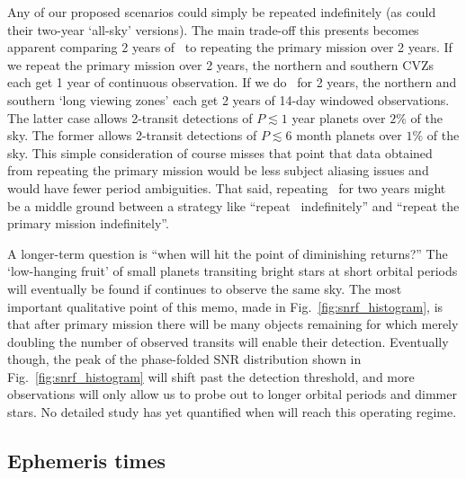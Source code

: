 Any of our proposed scenarios could simply be repeated indefinitely (as could their two-year `all-sky' versions).
The main trade-off this presents becomes apparent comparing 2 years of \hemis\ to repeating the primary mission over 2 years.
If we repeat the primary mission over 2 years, the northern and southern CVZs each get 1 year of continuous observation.
If we do \hemis\ for 2 years, the northern and southern `long viewing zones' each get 2 years of 14-day windowed observations.
The latter case allows 2-transit detections of $P\lesssim1$ year planets over $2\%$ of the sky.
The former allows 2-transit detections of $P\lesssim6$ month planets over $1\%$ of the sky.
This simple consideration of course misses that point that data obtained from repeating the primary mission would be less subject aliasing issues and would have fewer period ambiguities.
That said, repeating \hemis\ for two years might be a middle ground between a strategy like ``repeat \npole\ indefinitely'' and ``repeat the primary mission indefinitely''.

A longer-term question is ``when will \tess hit the point of diminishing returns?''
The `low-hanging fruit' of small planets transiting bright stars at short orbital periods will eventually be found if \tess continues to observe the same sky.
The most important qualitative point of this memo, made in Fig.~\ref{fig:snrf_histogram}, is that after \tesss primary mission there will be many objects remaining for which merely doubling the number of observed transits will enable their detection.
Eventually though, the peak of the phase-folded SNR distribution shown in Fig.~\ref{fig:snrf_histogram} will shift past the detection threshold, and more observations will only allow us to probe out to longer orbital periods and dimmer stars.
No detailed study has yet quantified when \tess will reach this operating regime.



\subsection{Ephemeris times}
\label{sec:ephemeris_times}

